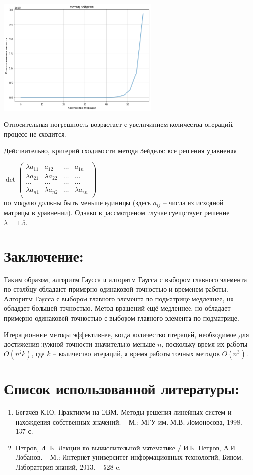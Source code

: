 \documentclass{article}
\begin{document}
\includegraphics[width=0.6\textwidth]{not_conv.png}

Относительная погрешность возрастает с увеличинием количества операций, процесс не сходится.

\newcommand{\lm}{\lambda}

Действительно, критерий сходимости метода Зейделя: все решения уравнения

$ \det \begin{pmatrix}
\lm a_{11} & a_{12} & \dots & a_{1n} \\
\lm a_{21} & \lm a_{22} & \dots & \dots \\
\dots & \dots & \dots &  \dots \\
\lm a_{n1} & \lm a_{n2} & \dots & \lm a_{nn} \\
\end{pmatrix}$ \\
по модулю должны быть меньше единицы (здесь $a_{ij}$ -- числа из исходной матрицы в уравнении).
Однако в рассмотреном случае суещствует решение $\lm = 1.5$.

\section{Заключение:}
Таким образом, алгоритм Гаусса и алгоритм Гаусса с выбором главного элемента по столбцу обладают примерно одинаковой точностью и временем работы. Алгоритм Гаусса с выбором главного элемента по подматрице медленнее, но обладает большей точностью. Метод вращений ещё медленнее, но обладает примерно одинаковой точностью с выбором главного элемента по подматрице.

Итерационные методы эффективнее, когда количество итераций, необходимое для достижения нужной точности значительно меньше $n$, поскольку время их работы $O(n^2 k)$, где $k$ -- количество итераций, а время работы точных методов $O(n^3)$.

\section{Список использованной литературы:}
\begin{enumerate}
    \item Богачёв К.Ю. Практикум на ЭВМ. Методы решения линейных систем и нахождения собственных значений. -- М.: МГУ им. М.В. Ломоносова, 1998. -- 137 с.
    \item Петров, И. Б. Лекции по вычислительной математике / И.Б. Петров, А.И. Лобанов. -- М.: Интернет-университет информационных технологий, Бином. Лаборатория знаний, 2013. -- 528 c.
\end{enumerate}
\end{document}
